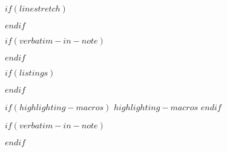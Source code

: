 \usepackage{amsmath}
$if(linestretch)$
\usepackage{setspace}
$endif$

\usepackage{calc}
\usepackage{printlen}

\usepackage[$if(fontenc)$$fontenc$$else$T1$endif$]{fontenc}
\usepackage[utf8]{inputenc}
\usepackage{textcomp} %

\usepackage{hyperref}
\usepackage{cleveref}

$if(verbatim-in-note)$
\usepackage{fancyvrb}
$endif$
\usepackage{xcolor}
\usepackage{physics}

$if(listings)$
\usepackage{listings}
$endif$

$if(highlighting-macros)$
$highlighting-macros$
$endif$

$if(verbatim-in-note)$
\usepackage{fancyvrb}
$endif$

\usepackage{soul}

\usepackage{microtype}

\usepackage{longtable,booktabs,array}
\usepackage{etoolbox}
\makeatletter
\patchcmd\longtable{\par}{\if@noskipsec\mbox{}\fi\par}{}{}
\makeatother
\usepackage{footnotehyper}




